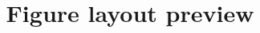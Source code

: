 \documentclass[conference]{IEEEtran}
\begin{document}
\title{Figure layout preview}
\maketitle

\end{document}

